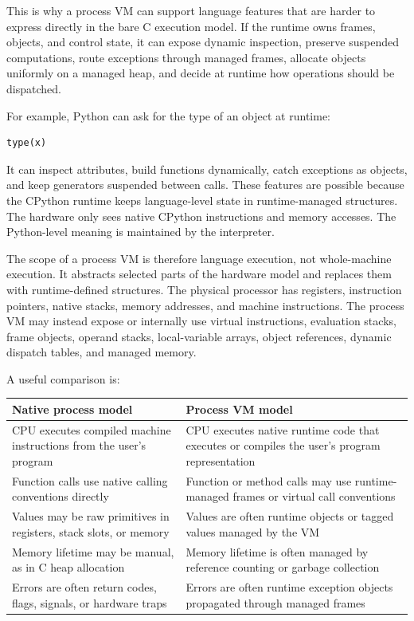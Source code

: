 \documentclass[a4paper,twoside]{report}
\begin{document}
This is why a process VM can support language features that are harder to express directly in the bare C execution model. If the runtime owns frames, objects, and control state, it can expose dynamic inspection, preserve suspended computations, route exceptions through managed frames, allocate objects uniformly on a managed heap, and decide at runtime how operations should be dispatched.

For example, Python can ask for the type of an object at runtime:

\begin{verbatim}
type(x)
\end{verbatim}

It can inspect attributes, build functions dynamically, catch exceptions as objects, and keep generators suspended between calls. These features are possible because the CPython runtime keeps language-level state in runtime-managed structures. The hardware only sees native CPython instructions and memory accesses. The Python-level meaning is maintained by the interpreter.

The scope of a process VM is therefore language execution, not whole-machine execution. It abstracts selected parts of the hardware model and replaces them with runtime-defined structures. The physical processor has registers, instruction pointers, native stacks, memory addresses, and machine instructions. The process VM may instead expose or internally use virtual instructions, evaluation stacks, frame objects, operand stacks, local-variable arrays, object references, dynamic dispatch tables, and managed memory.

A useful comparison is:

\begin{center}
\begin{tabular}{|p{}|p{}|}
\hline
\textbf{Native process model} & \textbf{Process VM model} \\
\hline
CPU executes compiled machine instructions from the user's program & CPU executes native runtime code that executes or compiles the user's program representation \\
\hline
Function calls use native calling conventions directly & Function or method calls may use runtime-managed frames or virtual call conventions \\
\hline
Values may be raw primitives in registers, stack slots, or memory & Values are often runtime objects or tagged values managed by the VM \\
\hline
Memory lifetime may be manual, as in C heap allocation & Memory lifetime is often managed by reference counting or garbage collection \\
\hline
Errors are often return codes, flags, signals, or hardware traps & Errors are often runtime exception objects propagated through managed frames \\
\hline
\end{tabular}
\end{center}
\end{document}
